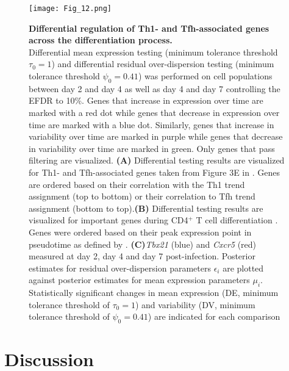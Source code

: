 \newpage

\begin{figure}[!h]
  \begin{minipage}[c]{0.57\textwidth}
    \texttt{[image: Fig\_12.png]}
  \end{minipage}\hfill
  \begin{minipage}[c]{0.4\textwidth}
\caption[Differential regulation of lineage-associated genes across differentiation]{\textbf{Differential regulation of Th1- and Tfh-associated genes across the differentiation process.}\\
Differential mean expression testing (minimum tolerance threshold $\tau_0=1$) and differential residual over-dispersion testing (minimum tolerance threshold $\psi_0=0.41$) was performed on cell populations between day 2 and day 4 as well as day 4 and day 7 controlling the EFDR to 10\%. Genes that increase in expression over time are marked with a red dot while genes that decrease in expression over time are marked with a blue dot. Similarly, genes that increase in variability over time are marked in purple while genes that decrease in variability over time are marked in green. Only genes that pass filtering are visualized. \textbf{(A)} Differential testing results are visualized for Th1- and Tfh-associated genes taken from Figure 3E in \cite{Lonnberg2017}. Genes are ordered based on their correlation with the Th1 trend assignment (top to bottom) or their correlation to Tfh trend assignment (bottom to top).\textbf{(B)} Differential testing results are visualized for important genes during CD4$^+$ T cell differentiation \citep[taken from Figure 5A in][]{Lonnberg2017}. Genes were ordered based on their peak expression point in pseudotime as defined by \cite{Lonnberg2017}. \textbf{(C)}\textit{Tbx21} (blue) and \textit{Cxcr5} (red) measured at day 2, day 4 and day 7 post-infection. Posterior estimates for residual over-dispersion parameters $\epsilon_i$ are plotted against posterior estimates for mean expression parameters $\mu_i$. Statistically significant changes in mean expression (DE, minimum tolerance threshold of $\tau_0=1$) and variability (DV, minimum tolerance threshold of $\psi_0=0.41$) are indicated for each comparison} \label{fig2:immune_differentiation2}
  \end{minipage}
\end{figure}

\newpage


\section{Discussion}

